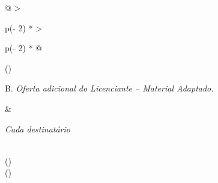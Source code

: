 \documentclass[
]{article}
\begin{document}
\begin{longtable}[]{@{}
  >{\raggedright\arraybackslash}p{(\columnwidth - 2\tabcolsep) * }
  >{\raggedright\arraybackslash}p{(\columnwidth - 2\tabcolsep) * }@{}}
\toprule()
\begin{minipage}[b]{\linewidth}\raggedright
B. \emph{Oferta adicional do Licenciante -- Material Adaptado.}
\end{minipage} & \begin{minipage}[b]{\linewidth}\raggedright
\emph{Cada destinatário}
\end{minipage} \\
\midrule()
\endhead
{} \\
\bottomrule()
\end{longtable}
\end{document}
